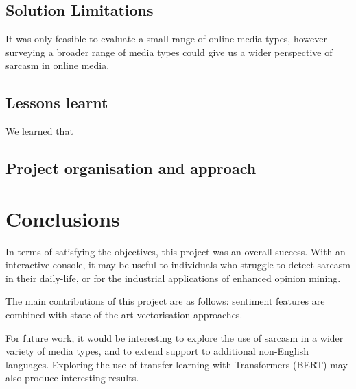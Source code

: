 \documentclass[12pt,a4paper]{article}
\begin{document}
\subsection{Solution Limitations}
It was only feasible to evaluate a small range of online media types, however surveying a broader range of media types could give us a wider perspective of sarcasm in online media.


\subsection{Lessons learnt}
We learned that 


\subsection{Project organisation and approach}





\section{Conclusions}
In terms of satisfying the objectives, this project was an overall success. With an interactive console, it may be useful to individuals who struggle to detect sarcasm in their daily-life, or for the industrial applications of enhanced opinion mining.

The main contributions of this project are as follows: sentiment features are combined with state-of-the-art vectorisation approaches. 

For future work, it would be interesting to explore the use of sarcasm in a wider variety of media types, and to extend support to additional non-English languages. Exploring the use of transfer learning with Transformers (BERT) may also produce interesting results.



\end{document}
